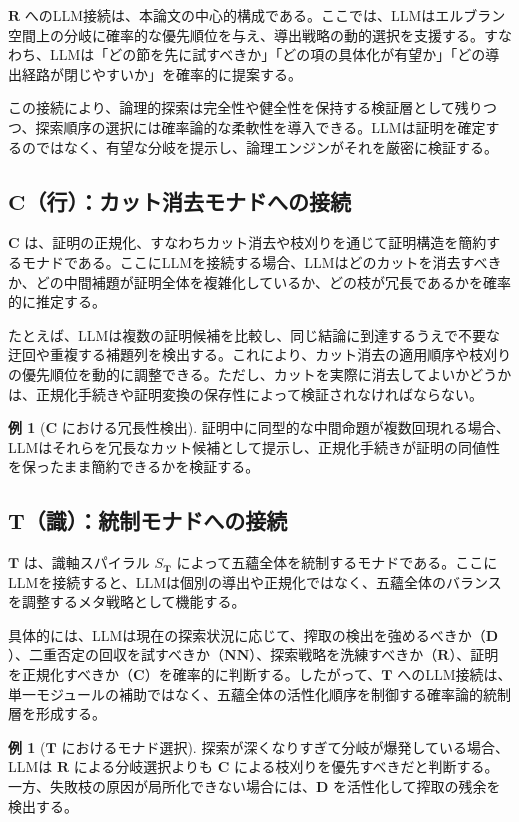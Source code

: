 \documentclass[11pt,a4paper]{ltjsarticle}
\theoremstyle{definition}
\newtheorem{example}[theorem]{例}
\newcommand{\Md}{\mathbf{D}}
\newcommand{\Mnn}{\mathbf{NN}}
\newcommand{\Mr}{\mathbf{R}}
\newcommand{\MC}{\mathbf{C}}
\newcommand{\MT}{\mathbf{T}}
\begin{document}
$\Mr$ へのLLM接続は、本論文の中心的構成である。ここでは、LLMはエルブラン空間上の分岐に確率的な優先順位を与え、導出戦略の動的選択を支援する。すなわち、LLMは「どの節を先に試すべきか」「どの項の具体化が有望か」「どの導出経路が閉じやすいか」を確率的に提案する。

この接続により、論理的探索は完全性や健全性を保持する検証層として残りつつ、探索順序の選択には確率論的な柔軟性を導入できる。LLMは証明を確定するのではなく、有望な分岐を提示し、論理エンジンがそれを厳密に検証する。

\subsection{$\MC$（行）：カット消去モナドへの接続}

$\MC$ は、証明の正規化、すなわちカット消去や枝刈りを通じて証明構造を簡約するモナドである。ここにLLMを接続する場合、LLMはどのカットを消去すべきか、どの中間補題が証明全体を複雑化しているか、どの枝が冗長であるかを確率的に推定する。

たとえば、LLMは複数の証明候補を比較し、同じ結論に到達するうえで不要な迂回や重複する補題列を検出する。これにより、カット消去の適用順序や枝刈りの優先順位を動的に調整できる。ただし、カットを実際に消去してよいかどうかは、正規化手続きや証明変換の保存性によって検証されなければならない。

\begin{example}[$\MC$ における冗長性検出]
証明中に同型的な中間命題が複数回現れる場合、LLMはそれらを冗長なカット候補として提示し、正規化手続きが証明の同値性を保ったまま簡約できるかを検証する。
\end{example}

\subsection{$\MT$（識）：統制モナドへの接続}

$\MT$ は、識軸スパイラル $S_{\MT}$ によって五蘊全体を統制するモナドである。ここにLLMを接続すると、LLMは個別の導出や正規化ではなく、五蘊全体のバランスを調整するメタ戦略として機能する。

具体的には、LLMは現在の探索状況に応じて、搾取の検出を強めるべきか（$\Md$）、二重否定の回収を試すべきか（$\Mnn$）、探索戦略を洗練すべきか（$\Mr$）、証明を正規化すべきか（$\MC$）を確率的に判断する。したがって、$\MT$ へのLLM接続は、単一モジュールの補助ではなく、五蘊全体の活性化順序を制御する確率論的統制層を形成する。

\begin{example}[$\MT$ におけるモナド選択]
探索が深くなりすぎて分岐が爆発している場合、LLMは $\Mr$ による分岐選択よりも $\MC$ による枝刈りを優先すべきだと判断する。一方、失敗枝の原因が局所化できない場合には、$\Md$ を活性化して搾取の残余を検出する。
\end{example}
\end{document}
